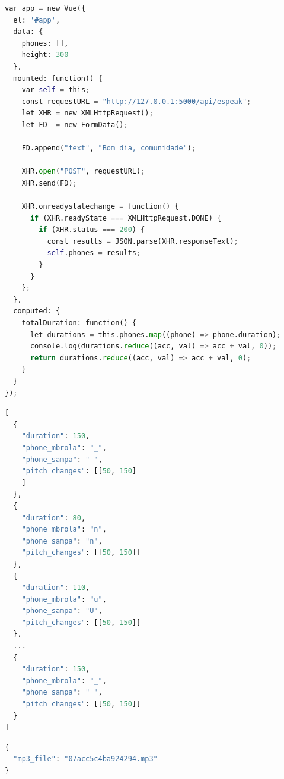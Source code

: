 \begin{lstlisting}[caption=Editor gráfico, label=editorjs, language=Python]
var app = new Vue({
  el: '#app',
  data: {
    phones: [],
    height: 300
  },
  mounted: function() {
    var self = this;
    const requestURL = "http://127.0.0.1:5000/api/espeak";
    let XHR = new XMLHttpRequest();
    let FD  = new FormData();

    FD.append("text", "Bom dia, comunidade");

    XHR.open("POST", requestURL);
    XHR.send(FD);

    XHR.onreadystatechange = function() {
      if (XHR.readyState === XMLHttpRequest.DONE) {
        if (XHR.status === 200) {
          const results = JSON.parse(XHR.responseText);
          self.phones = results;
        }
      }
    };
  },
  computed: {
    totalDuration: function() {
      let durations = this.phones.map((phone) => phone.duration);
      console.log(durations.reduce((acc, val) => acc + val, 0));
      return durations.reduce((acc, val) => acc + val, 0);
    }
  }
});
\end{lstlisting}

\begin{lstlisting}[caption=Exemplo de resposta para \emph{endpoint} do eSpeakNG, label=espeakpost, language=Python]
[
  {
    "duration": 150,
    "phone_mbrola": "_",
    "phone_sampa": " ",
    "pitch_changes": [[50, 150]
    ]
  },
  {
    "duration": 80,
    "phone_mbrola": "n",
    "phone_sampa": "n",
    "pitch_changes": [[50, 150]]
  },
  {
    "duration": 110,
    "phone_mbrola": "u",
    "phone_sampa": "U",
    "pitch_changes": [[50, 150]]
  },
  ...
  {
    "duration": 150,
    "phone_mbrola": "_",
    "phone_sampa": " ",
    "pitch_changes": [[50, 150]]
  }
]
\end{lstlisting}

\begin{lstlisting}[caption=Exemplo de resposta para \emph{endpoint} do MBROLA, label=mbrolaget, language=Python]
{
  "mp3_file": "07acc5c4ba924294.mp3"
}
\end{lstlisting}

